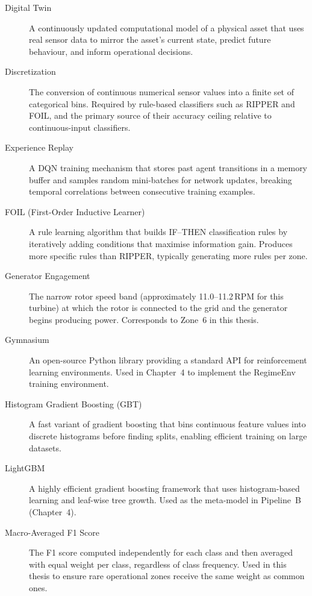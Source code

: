 \begin{description}
  \item[Digital Twin] A continuously updated computational model of a physical asset that
    uses real sensor data to mirror the asset's current state, predict future behaviour,
    and inform operational decisions.

  \item[Discretization] The conversion of continuous numerical sensor values into a finite
    set of categorical bins. Required by rule-based classifiers such as RIPPER and FOIL,
    and the primary source of their accuracy ceiling relative to continuous-input
    classifiers.

  \item[Experience Replay] A DQN training mechanism that stores past agent transitions in
    a memory buffer and samples random mini-batches for network updates, breaking temporal
    correlations between consecutive training examples.

  \item[FOIL (First-Order Inductive Learner)] A rule learning algorithm that builds
    IF--THEN classification rules by iteratively adding conditions that maximise
    information gain. Produces more specific rules than RIPPER, typically generating more
    rules per zone.

  \item[Generator Engagement] The narrow rotor speed band (approximately 11.0--11.2\,RPM
    for this turbine) at which the rotor is connected to the grid and the generator begins
    producing power. Corresponds to Zone~6 in this thesis.

  \item[Gymnasium] An open-source Python library providing a standard API for
    reinforcement learning environments. Used in Chapter~4 to implement the RegimeEnv
    training environment.

  \item[Histogram Gradient Boosting (GBT)] A fast variant of gradient boosting that bins
    continuous feature values into discrete histograms before finding splits, enabling
    efficient training on large datasets.

  \item[LightGBM] A highly efficient gradient boosting framework that uses histogram-based
    learning and leaf-wise tree growth. Used as the meta-model in Pipeline~B (Chapter~4).

  \item[Macro-Averaged F1 Score] The F1 score computed independently for each class and
    then averaged with equal weight per class, regardless of class frequency. Used in this
    thesis to ensure rare operational zones receive the same weight as common ones.


\end{description}
